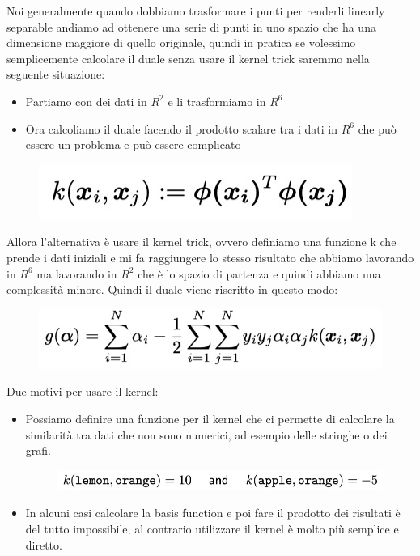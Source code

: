 \documentclass[14pt]{extreport}
\begin{document}
Noi generalmente quando dobbiamo trasformare i punti per renderli linearly separable andiamo ad ottenere una serie di punti in uno spazio che ha una
dimensione maggiore di quello originale, quindi in pratica se volessimo semplicemente calcolare il duale senza usare il kernel trick saremmo nella
seguente situazione:
\begin{itemize}
\item Partiamo con dei dati in $R^2$ e li trasformiamo in $R^6$
\item Ora calcoliamo il duale facendo il prodotto scalare tra i dati in $R^6$ che può essere un problema e può essere complicato
\end{itemize}

\begin{figure}[H]
\centering
\includegraphics[width=0.4\linewidth]{336.jpeg}
\end{figure}
Allora l'alternativa è usare il kernel trick, ovvero definiamo una funzione k che prende i dati iniziali e mi fa raggiungere lo stesso risultato che
abbiamo lavorando in $R^6$ ma lavorando in $R^2$ che è lo spazio di partenza e quindi abbiamo una complessità minore. Quindi il duale viene riscritto
in questo modo:
\begin{figure}[H]
\centering
\includegraphics[width=0.5\linewidth]{337.jpeg}
\end{figure}

Due motivi per usare il kernel:
\begin{itemize}
\item Possiamo definire una funzione per il kernel che ci permette di calcolare la similarità tra dati che non sono numerici, ad esempio delle
stringhe o dei grafi.
\begin{figure}[H]
\centering
\includegraphics[width=0.4\linewidth]{338.jpeg}
\end{figure}
\item In alcuni casi calcolare la basis function e poi fare il prodotto dei risultati è del tutto impossibile, al contrario utilizzare il kernel è
molto più semplice e diretto.
\end{itemize}
\end{document}
